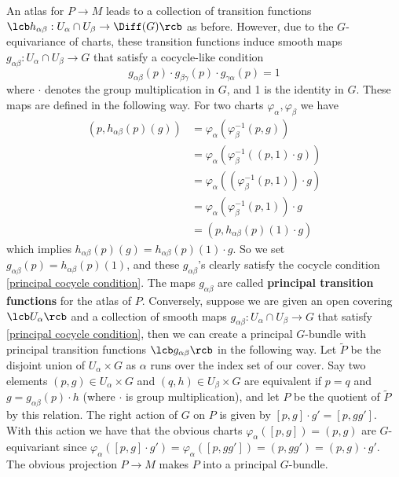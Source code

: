 An atlas for $P \rightarrow M$ leads to a collection of transition functions $\lcb h_{\alpha\beta} : U_\alpha \cap U_\beta \rightarrow \Diff(G) \rcb$ as before. However, due to the $G$-equivariance of charts, these transition functions induce smooth maps $g_{\alpha\beta} : U_\alpha \cap U_\beta \rightarrow G$ that satisfy a cocycle-like condition
\begin{equation}
\label{principal cocycle condition}
g_{\alpha\beta}(p) \cdot g_{\beta\gamma}(p) \cdot g_{\gamma\alpha}(p) = 1
\end{equation}
where $\cdot$ denotes the group multiplication in $G$, and 1 is the identity in $G$. These maps are defined in the following way. For two charts $\varphi_\alpha,\varphi_\beta$ we have
\begin{align*}
	(p,h_{\alpha\beta}(p)(g)) &= \varphi_\alpha(\varphi_\beta^{-1}(p,g)) \\
	                          &= \varphi_\alpha(\varphi_\beta^{-1}((p,1)\cdot g)) \\
	                          &= \varphi_\alpha((\varphi_\beta^{-1}(p,1)) \cdot g) \\
	                          &= \varphi_\alpha(\varphi_\beta^{-1}(p,1)) \cdot g \\
	                          &= (p, h_{\alpha\beta}(p)(1) \cdot g)
\end{align*}
which implies $h_{\alpha\beta}(p)(g) = h_{\alpha\beta}(p)(1) \cdot g$. So we set $g_{\alpha\beta}(p) = h_{\alpha\beta}(p)(1)$, and these $g_{\alpha\beta}$'s clearly satisfy the cocycle condition \eqref{principal cocycle condition}. The maps $g_{\alpha\beta}$ are called \textbf{principal transition functions} for the atlas of $P$. Conversely, suppose we are given an open covering $\lcb U_\alpha \rcb$ and a collection of smooth maps $g_{\alpha\beta} : U_\alpha \cap U_\beta \rightarrow G$ that satisfy \eqref{principal cocycle condition}, then we can create a principal $G$-bundle with principal transition functions $\lcb g_{\alpha\beta} \rcb$ in the following way. Let $\tilde{P}$ be the disjoint union of $U_\alpha \times G$ as $\alpha$ runs over the index set of our cover. Say two elements $(p,g) \in U_\alpha \times G$ and $(q,h) \in U_\beta \times G$ are equivalent if $p=q$ and $g = g_{\alpha\beta}(p) \cdot h$ (where $\cdot$ is group multiplication), and let $P$ be the quotient of $\tilde P$ by this relation. The right action of $G$ on $P$ is given by $[p,g] \cdot g' = [p,gg']$. With this action we have that the obvious charts $\varphi_\alpha([p,g]) = (p,g)$ are $G$-equivariant since $\varphi_\alpha([p,g] \cdot g') = \varphi_\alpha([p,gg']) = (p,gg')=(p,g) \cdot g'$. The obvious projection $P \rightarrow M$ makes $P$ into a principal $G$-bundle. 

